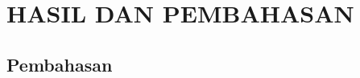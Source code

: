 \chapter{HASIL DAN PEMBAHASAN}
\label{chap:hasil_dan_pembahasan}



\section{Pembahasan}
\label{sec:pembahasan}
